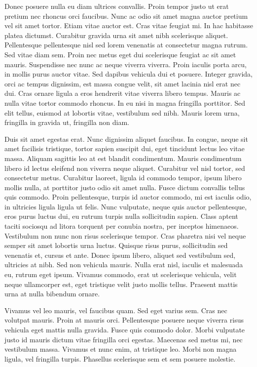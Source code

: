 Donec posuere nulla eu diam ultrices convallis.
Proin tempor justo ut erat pretium nec rhoncus orci faucibus.
Nunc ac odio sit amet magna auctor pretium vel sit amet tortor.
Etiam vitae auctor est.
Cras vitae feugiat mi.
In hac habitasse platea dictumst.
Curabitur gravida urna sit amet nibh scelerisque aliquet.
Pellentesque pellentesque nisl sed lorem venenatis at consectetur magna rutrum.
Sed vitae diam sem.
Proin nec metus eget dui scelerisque feugiat ac sit amet mauris.
Suspendisse nec nunc ac neque viverra viverra.
Proin iaculis porta arcu, in mollis purus auctor vitae.
Sed dapibus vehicula dui et posuere.
Integer gravida, orci ac tempus dignissim, est massa congue velit, sit amet lacinia nisl erat nec dui.
Cras ornare ligula a eros hendrerit vitae viverra libero tempus.
Mauris ac nulla vitae tortor commodo rhoncus.
In eu nisi in magna fringilla porttitor.
Sed elit tellus, euismod at lobortis vitae, vestibulum sed nibh.
Mauris lorem urna, fringilla in gravida ut, fringilla non diam.

Duis sit amet egestas erat.
Nunc dignissim aliquet faucibus.
In congue, neque sit amet facilisis tristique, tortor sapien suscipit dui, eget tincidunt lectus leo vitae massa.
Aliquam sagittis leo at est blandit condimentum.
Mauris condimentum libero id lectus eleifend non viverra neque aliquet.
Curabitur vel nisl tortor, sed consectetur metus.
Curabitur laoreet, ligula id commodo tempor, ipsum libero mollis nulla, at porttitor justo odio sit amet nulla.
Fusce dictum convallis tellus quis commodo.
Proin pellentesque, turpis id auctor commodo, mi est iaculis odio, in ultricies ligula ligula ut felis.
Nunc vulputate, neque quis auctor pellentesque, eros purus luctus dui, eu rutrum turpis nulla sollicitudin sapien.
Class aptent taciti sociosqu ad litora torquent per conubia nostra, per inceptos himenaeos.
Vestibulum non nunc non risus scelerisque tempor.
Cras pharetra nisi vel neque semper sit amet lobortis urna luctus.
Quisque risus purus, sollicitudin sed venenatis et, cursus et ante.
Donec ipsum libero, aliquet sed vestibulum sed, ultricies at nibh.
Sed non vehicula mauris.
Nulla erat nisl, iaculis et malesuada eu, rutrum eget ipsum.
Vivamus commodo, erat ut scelerisque vehicula, velit neque ullamcorper est, eget tristique velit justo mollis tellus.
Praesent mattis urna at nulla bibendum ornare.

Vivamus vel leo mauris, vel faucibus quam.
Sed eget varius sem.
Cras nec volutpat mauris.
Proin at mauris orci.
Pellentesque posuere neque viverra risus vehicula eget mattis nulla gravida.
Fusce quis commodo dolor.
Morbi vulputate justo id mauris dictum vitae fringilla orci egestas.
Maecenas sed metus mi, nec vestibulum massa.
Vivamus et nunc enim, at tristique leo.
Morbi non magna ligula, vel fringilla turpis.
Phasellus scelerisque sem et sem posuere molestie.

